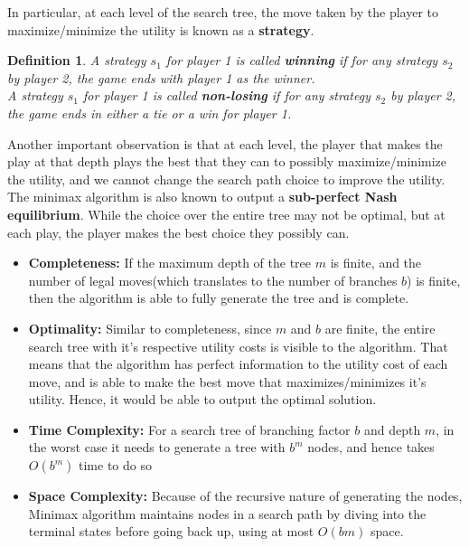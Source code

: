 \documentclass[12pt]{article}
\newtheorem{definition}{Definition}
\begin{document}
In particular, at each level of the search tree, the move taken by the player to maximize/minimize the utility is known as a \textbf{strategy}.  

\begin{definition}
A strategy $s_1$ for player 1 is called \textbf{winning} if for any strategy $s_2$ by player 2, the game ends with player 1 as the winner.\\
A strategy $s_1$ for player 1 is called \textbf{non-losing} if for any strategy $s_2$ by player 2, the game ends in either a tie or a win for player 1.
\end{definition}

Another important observation is that at each level, the player that makes the play at that depth plays the best that they can to possibly maximize/minimize the utility, and we cannot change the search path choice to improve the utility. The minimax algorithm is also known to output a \textbf{sub-perfect Nash equilibrium}. While the choice over the entire tree may not be optimal, but at each play, the player makes the best choice they possibly can.

\begin{itemize}
\item \textbf{Completeness:} If the maximum depth of the tree $m$ is finite, and the number of legal moves(which translates to the number of branches $b$) is finite, then the algorithm is able to fully generate the tree and is complete.

\item \textbf{Optimality:} Similar to completeness, since $m$ and $b$ are finite, the entire search tree with it's respective utility costs is visible to the algorithm. That means that the algorithm has perfect information to the utility cost of each move, and is able to make the best move that maximizes/minimizes it's utility. Hence, it would be able to output the optimal solution.

\item \textbf{Time Complexity:} For a search tree of branching factor $b$ and depth $m$, in the worst case it needs to generate a tree with $b^m$ nodes, and hence takes $O(b^m)$ time to do so

\item \textbf{Space Complexity:} Because of the recursive nature of generating the nodes, Minimax algorithm maintains nodes in a search path by diving into the terminal states before going back up, using at most $O(bm)$ space.
\end{itemize}
\end{document}
